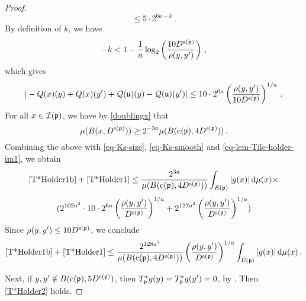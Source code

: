 \begin{proof}
        $$
            \le 5 \cdot 2^{6a - k}\,.
        $$
        By definition of $k$, we have
        $$
            -k < 1 - \frac{1}{a} \log_2\left(\frac{10 D^{{\mathrm{s}}({\mathfrak p})}}{\rho(y,y')}\right)\,,
        $$
        which gives
      \begin{equation}
            \label{eq-lem-Tile-holder-im1}
             |-{Q}(x)(y) + {Q}(x)(y') + {\mathcal{Q}}({\mathfrak u})(y) - {\mathcal{Q}}({\mathfrak u})(y')| \le 10 \cdot 2^{6a} \left(\frac{\rho(y,y')}{10 D^{{\mathrm{s}}({\mathfrak p})}}\right)^{1/a}\,.
        \end{equation}
        For all $x \in {\mathcal{I}}({\mathfrak p})$, we have by \eqref{doublingx} that
        $$
            \mu(B(x, D^{{\mathrm{s}}({\mathfrak p})})) \ge 2^{-3a} \mu(B({\mathrm{c}}({\mathfrak p}), 4D^{{\mathrm{s}}({\mathfrak p})}))\,.
        $$
        Combining the above with \eqref{eq-Ks-size}, \eqref{eq-Ks-smooth} and \eqref{eq-lem-Tile-holder-im1},
        we obtain
        $$
            \eqref{T*Holder1b}+\eqref{T*Holder1} \le \frac{2^{3a}}{\mu(B({\mathrm{c}}({\mathfrak p}), 4D^{{\mathrm{s}}({\mathfrak p})}))} \int_{E({\mathfrak p})}|g(x)| \, \mathrm{d}\mu(x) \times
        $$
        $$
            (2^{102a^3} \cdot 10 \cdot 2^{6a} \left(\frac{\rho(y,y')}{ D^{{\mathrm{s}}({\mathfrak p})}}\right)^{1/a} + 2^{127a^3} \left(\frac{\rho(y,y')}{D^{{\mathrm{s}}({\mathfrak p})}}\right)^{1/a})
        $$
        Since $\rho(y,y') \le 10 D^{{\mathrm{s}}({\mathfrak p})}$, we conclude
        $$
            \eqref{T*Holder1b}+\eqref{T*Holder1} \le \frac{2^{128a^3}}{\mu(B({\mathrm{c}}({\mathfrak p}), 4D^{{\mathrm{s}}({\mathfrak p})}))} \left(\frac{\rho(y,y')}{D^{{\mathrm{s}}({\mathfrak p})}}\right)^{1/a} \int_{E({\mathfrak p})}|g(x)| \, \mathrm{d}\mu(x)\,.
        $$

        Next, if $y,y' \notin B({\mathrm{c}}({\mathfrak p}), 5D^{{\mathrm{s}}({\mathfrak p})})$, then $T_{{\mathfrak p}}^*g(y) = T_{{\mathfrak p}}^*g(y') = 0$, by . Then \eqref{T*Holder2} holds.


\end{proof}

